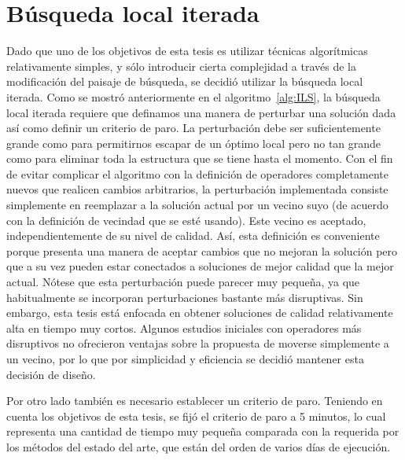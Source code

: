 \section{Búsqueda local iterada}

Dado que uno de los objetivos de esta tesis es utilizar técnicas algorítmicas relativamente simples, y sólo introducir cierta complejidad
a través de la modificación del paisaje de búsqueda, se decidió utilizar la búsqueda local iterada.
%
Como se mostró anteriormente en el algoritmo~\ref{alg:ILS}, la búsqueda local iterada requiere que definamos una manera de perturbar una 
solución dada así como definir un criterio de paro. 
%
La perturbación debe ser suficientemente grande como para permitirnos escapar de un óptimo local pero no tan grande como para eliminar toda 
la estructura que se tiene hasta el momento.
%
Con el fin de evitar complicar el algoritmo con la definición de operadores completamente nuevos que realicen cambios arbitrarios, la 
perturbación implementada consiste simplemente en reemplazar a la solución actual por un vecino suyo (de acuerdo con la definición de vecindad 
que se esté usando). 
%
Este vecino es aceptado, independientemente de su nivel de calidad.
%
Así, esta definición es conveniente porque presenta una manera de aceptar cambios que no mejoran la solución pero que a su vez pueden estar 
conectados a soluciones de mejor calidad que la mejor actual.
%
Nótese que esta perturbación puede parecer muy pequeña, ya que habitualmente se incorporan perturbaciones bastante más disruptivas.
%
Sin embargo, esta tesis está enfocada en obtener soluciones de calidad relativamente alta en tiempo muy cortos.
%
Algunos estudios iniciales con operadores más disruptivos no ofrecieron ventajas sobre la propuesta de moverse simplemente a un vecino,
por lo que por simplicidad y eficiencia se decidió mantener esta decisión de diseño.

Por otro lado también es necesario establecer un criterio de paro. 
%
Teniendo en cuenta los objetivos de esta tesis, se fijó el criterio de paro a 5 minutos, lo cual representa una cantidad de tiempo muy pequeña comparada 
con la requerida por los métodos del estado del arte, que están del orden de varios días de ejecución.

